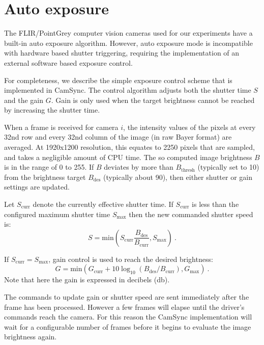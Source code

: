 \section{Auto exposure}
\newcommand{\Bdes}{B_{\mathrm{des}}}
\newcommand{\Bcurr}{B_{\mathrm{curr}}}
\newcommand{\Bthresh}{B_{\mathrm{thresh}}}
\newcommand{\Scurr}{S_{\mathrm{curr}}}
\newcommand{\Smax}{S_{\mathrm{max}}}
\newcommand{\Gmax}{G_{\mathrm{max}}}
\newcommand{\Gcurr}{G_{\mathrm{curr}}}

\label{sec:auto_exposure}
The FLIR/PointGrey computer vision cameras used for our experiments
have a built-in auto exposure algorithm. However, auto exposure mode
is incompatible with hardware based shutter triggering, requiring
the implementation of an external software based exposure control.

For completeness, we describe the simple exposure control scheme
\cite{Liang2007} that 
is implemented in CamSync. The control algorithm adjusts both the
shutter time $S$ and the gain $G$. Gain is only used when the target
brightness cannot be reached by increasing the shutter time.

When a frame is received for camera $i$, the intensity values of the
pixels at every 32nd row and every 32nd  column of the image (in raw
Bayer format) are averaged. At 1920x1200 resolution, this equates to
2250 pixels that are sampled, and takes a negligible amount of CPU
time. The so computed image brightness $B$ is in the range of 0 to
255. If $B$ deviates by more than $\Bthresh$ (typically set to 10) from the
brightness target $\Bdes$ (typically about 90), then either shutter or
gain settings are updated.

Let $\Scurr$ denote the currently effective shutter time.
If $\Scurr$ is less than the configured maximum
shutter time $\Smax$ then the new commanded shutter speed is:
\begin{equation}
 S = \mathrm{min}(\Scurr \frac{\Bdes}{\Bcurr},\Smax)\ .
\end{equation}

If $\Scurr = \Smax$, gain control is used to reach the desired
brightness:
\begin{equation}
 G = \mathrm{min}(\Gcurr + 10 \log_{10}(\Bdes/\Bcurr),\Gmax)\ .
\end{equation}
Note that here the gain is expressed in decibels (db).

The commands to update gain or shutter speed are sent immediately
after the frame has been processed. However a few frames will elapse
until the driver's commands reach the camera. For
this reason the CamSync implementation will wait for a configurable
number of frames before it begins to evaluate the image brightness
again.
